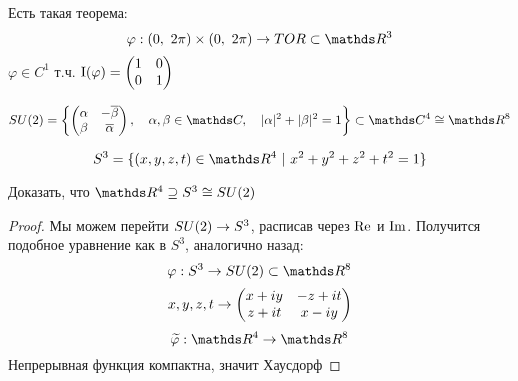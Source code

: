 \documentclass[main]{subfiles}
\begin{document}
    \begin{remark}
      Есть такая теорема:
      \[\varphi: (0,\ 2\pi) \times (0,\ 2\pi) \ra TOR \subset \R^3\]
      $\varphi \in C^1$ т.ч. $\RNumb{1}(\varphi) = \begin{pmatrix}
        1 & 0\\
        0 & 1
      \end{pmatrix}$\\
    \end{remark}

    \begin{Definition}
      \[SU(2) = \left\{ \begin{pmatrix}
        \alpha & - \ol{\beta}\\
        \beta & \ol{\alpha}
      \end{pmatrix},\q \alpha,\beta \in \CC,\q |\alpha|^2 + |\beta|^2 = 1 \right\} \subset \CC^4 \cong \R^8\]
    \end{Definition}

    \begin{Definition}
      \[S^3 = \{(x,y,z,t) \in \R^4\ |\ x^2+y^2+z^2+t^2 =1 \}\]
    \end{Definition}

    \begin{example}
      Доказать, что $\R^4 \supseteq S^3 \cong SU(2)$
    \end{example}

    \begin{proof}
      Мы можем перейти $SU(2) \rightarrow S^3$, расписав через $\mathop{\rm Re}\nolimits$ и $\mathop{\rm Im}\nolimits$. Получится подобное уравнение как в $S^3$, аналогично назад:
      \[\varphi: S^3 \ra SU(2) \subset \R^8\]
      \[x,y,z,t  \rightarrow \begin{pmatrix}
        x + iy & -z + it\\
        z + it & x - iy
      \end{pmatrix}\]
      \[\w{\varphi}: \R^4 \ra \R^8\]
      Непрерывная функция компактна, значит Хаусдорф
    \end{proof}
\end{document}
